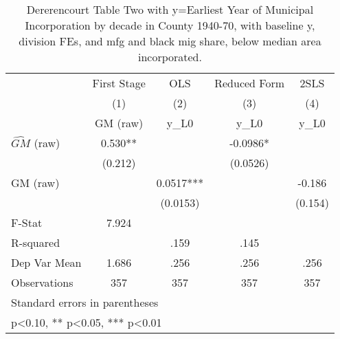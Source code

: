\begin{table}[htbp]\centering
\def\sym#1{\ifmmode^{#1}\else\(^{#1}\)\fi}
\caption{Dererencourt Table Two with y=Earliest Year of Municipal Incorporation by decade in County 1940-70, with baseline y, division FEs, and mfg and black mig share, below median area incorporated.}
\begin{tabular}{l*{4}{c}}
\toprule
                    & First Stage   &         OLS   &Reduced Form   &        2SLS   \\
                    &\multicolumn{1}{c}{(1)}&\multicolumn{1}{c}{(2)}&\multicolumn{1}{c}{(3)}&\multicolumn{1}{c}{(4)}\\
                    &\multicolumn{1}{c}{GM  (raw)}&\multicolumn{1}{c}{y\_L0}&\multicolumn{1}{c}{y\_L0}&\multicolumn{1}{c}{y\_L0}\\
\midrule
$\hat{GM}$ (raw)    &       0.530** &               &     -0.0986*  &               \\
                    &     (0.212)   &               &    (0.0526)   &               \\
\addlinespace
GM  (raw)           &               &      0.0517***&               &      -0.186   \\
                    &               &    (0.0153)   &               &     (0.154)   \\
\midrule
F-Stat              &       7.924   &               &               &               \\
R-squared           &               &        .159   &        .145   &               \\
Dep Var Mean        &       1.686   &        .256   &        .256   &        .256   \\
Observations        &         357   &         357   &         357   &         357   \\
\bottomrule
\multicolumn{5}{l}{\footnotesize Standard errors in parentheses}\\
\multicolumn{5}{l}{\footnotesize * p<0.10, ** p<0.05, *** p<0.01}\\
\end{tabular}
\end{table}
